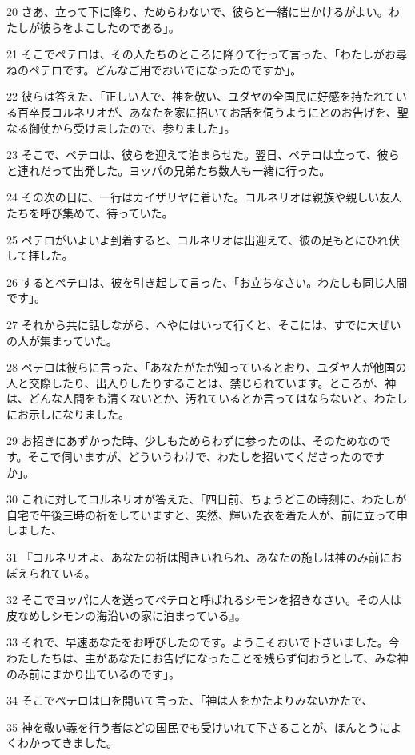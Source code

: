 \par 20 さあ、立って下に降り、ためらわないで、彼らと一緒に出かけるがよい。わたしが彼らをよこしたのである」。
\par 21 そこでペテロは、その人たちのところに降りて行って言った、「わたしがお尋ねのペテロです。どんなご用でおいでになったのですか」。
\par 22 彼らは答えた、「正しい人で、神を敬い、ユダヤの全国民に好感を持たれている百卒長コルネリオが、あなたを家に招いてお話を伺うようにとのお告げを、聖なる御使から受けましたので、参りました」。
\par 23 そこで、ペテロは、彼らを迎えて泊まらせた。翌日、ペテロは立って、彼らと連れだって出発した。ヨッパの兄弟たち数人も一緒に行った。
\par 24 その次の日に、一行はカイザリヤに着いた。コルネリオは親族や親しい友人たちを呼び集めて、待っていた。
\par 25 ペテロがいよいよ到着すると、コルネリオは出迎えて、彼の足もとにひれ伏して拝した。
\par 26 するとペテロは、彼を引き起して言った、「お立ちなさい。わたしも同じ人間です」。
\par 27 それから共に話しながら、へやにはいって行くと、そこには、すでに大ぜいの人が集まっていた。
\par 28 ペテロは彼らに言った、「あなたがたが知っているとおり、ユダヤ人が他国の人と交際したり、出入りしたりすることは、禁じられています。ところが、神は、どんな人間をも清くないとか、汚れているとか言ってはならないと、わたしにお示しになりました。
\par 29 お招きにあずかった時、少しもためらわずに参ったのは、そのためなのです。そこで伺いますが、どういうわけで、わたしを招いてくださったのですか」。
\par 30 これに対してコルネリオが答えた、「四日前、ちょうどこの時刻に、わたしが自宅で午後三時の祈をしていますと、突然、輝いた衣を着た人が、前に立って申しました、
\par 31 『コルネリオよ、あなたの祈は聞きいれられ、あなたの施しは神のみ前におぼえられている。
\par 32 そこでヨッパに人を送ってペテロと呼ばれるシモンを招きなさい。その人は皮なめしシモンの海沿いの家に泊まっている』。
\par 33 それで、早速あなたをお呼びしたのです。ようこそおいで下さいました。今わたしたちは、主があなたにお告げになったことを残らず伺おうとして、みな神のみ前にまかり出ているのです」。
\par 34 そこでペテロは口を開いて言った、「神は人をかたよりみないかたで、
\par 35 神を敬い義を行う者はどの国民でも受けいれて下さることが、ほんとうによくわかってきました。
